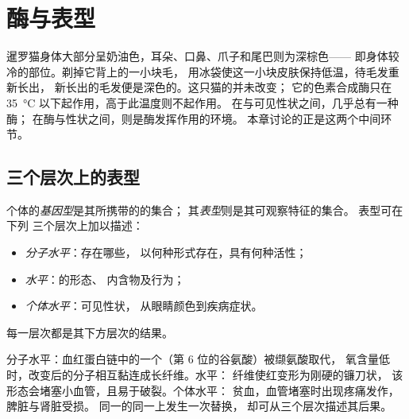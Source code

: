 \chapter{酶与表型}\label{ch:g11:enzymes-and-phenotype}

暹罗猫身体大部分呈奶油色，耳朵、口鼻、爪子和尾巴则为深棕色——
即身体较冷的部位。剃掉它背上的一小块毛，
用冰袋使这一小块皮肤保持低温，待毛发重新长出，
新长出的毛发便是深色的。这只猫的并未改变；
它的色素合成酶只在 \qty{35}{\celsius} 以下起作用，高于此温度则不起作用。
在与可见性状之间，几乎总有一种酶；
在酶与性状之间，则是酶发挥作用的环境。
本章讨论的正是这两个中间环节。

\section{三个层次上的表型}

\begin{definition}[基因型与表型]\label{def:g11:enzymes-and-phenotype:phenotype}
个体的\emph{基因型}是其所携带的的集合；
其\emph{表型}则是其可观察特征的集合。
表型可在下列
三个层次上加以描述：
\begin{itemize}
  \item \emph{分子水平}：存在哪些，
        以何种形式存在，具有何种活性；
  \item \emph{水平}：的形态、
        内含物及行为；
  \item \emph{个体水平}：可见性状，
        从眼睛颜色到疾病症状。
\end{itemize}
每一层次都是其下方层次的结果。
\end{definition}

\begin{example}[镰状细胞病的三个层次]\label{ex:g11:enzymes-and-phenotype:sickle}
分子水平：血红蛋白链中的一个（第 6 位的谷氨酸）被缬氨酸取代，
氧含量低时，改变后的分子相互黏连成长纤维。水平：
纤维使红变形为刚硬的镰刀状，
该形态会堵塞小血管，且易于破裂。个体水平：
贫血，血管堵塞时出现疼痛发作，脾脏与肾脏受损。
同一的同一上发生一次替换，
却可从三个层次描述其后果。
\end{example}

